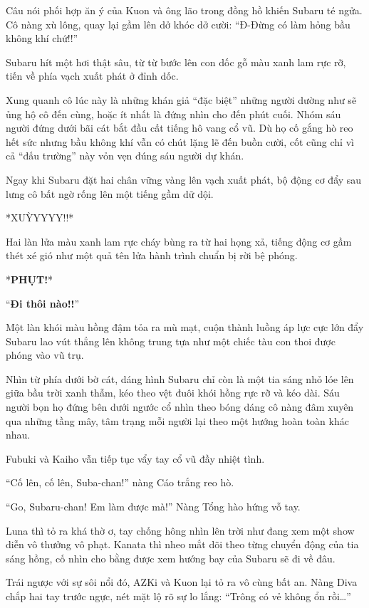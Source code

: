 \documentclass[../main.tex]{subfiles}
\begin{document}
Câu nói phối hợp ăn ý của Kuon và ông lão trong đồng hồ khiến Subaru té ngửa. Cô nàng xù lông, quay lại gầm lên dở khóc dở cười: ``Đ-Đừng có làm hỏng bầu không khí chứ!!''

\ct

Subaru hít một hơi thật sâu, từ từ bước lên con dốc gỗ màu xanh lam rực rỡ, tiến về phía vạch xuất phát ở đỉnh dốc.

Xung quanh cô lúc này là những khán giả ``đặc biệt'' những người dường như sẽ ủng hộ cô đến cùng, hoặc ít nhất là đứng nhìn cho đến phút cuối. Nhóm sáu người đứng dưới bãi cát bắt đầu cất tiếng hô vang cổ vũ. Dù họ cố gắng hò reo hết sức nhưng bầu không khí vẫn có chút lặng lẽ đến buồn cười, cốt cũng chỉ vì cả ``đấu trường'' này vỏn vẹn đúng sáu người dự khán.

Ngay khi Subaru đặt hai chân vững vàng lên vạch xuất phát, bộ động cơ đẩy sau lưng cô bất ngờ rống lên một tiếng gầm dữ dội.

*XUỲYYYY!!*

Hai làn lửa màu xanh lam rực cháy bùng ra từ hai họng xả, tiếng động cơ gầm thét xé gió như một quả tên lửa hành trình chuẩn bị rời bệ phóng.

*\textbf{PHỤT!}*

``\textbf{Đi thôi nào!!}''

Một làn khói màu hồng đậm tỏa ra mù mạt, cuộn thành luồng áp lực cực lớn đẩy Subaru lao vút thẳng lên không trung tựa như một chiếc tàu con thoi được phóng vào vũ trụ.

Nhìn từ phía dưới bờ cát, dáng hình Subaru chỉ còn là một tia sáng nhỏ lóe lên giữa bầu trời xanh thẫm, kéo theo vệt đuôi khói hồng rực rỡ và kéo dài. Sáu người bọn họ đứng bên dưới ngước cổ nhìn theo bóng dáng cô nàng đâm xuyên qua những tầng mây, tâm trạng mỗi người lại theo một hướng hoàn toàn khác nhau.


Fubuki và Kaiho vẫn tiếp tục vẩy tay cổ vũ đầy nhiệt tình.

``Cố lên, cố lên, Suba-chan!'' nàng Cáo trắng reo hò.

``Go, Subaru-chan! Em làm được mà!'' Nàng Tổng hào hứng vỗ tay.

Luna thì tỏ ra khá thờ ơ, tay chống hông nhìn lên trời như đang xem một show diễn vô thưởng vô phạt. Kanata thì nheo mắt dõi theo từng chuyển động của tia sáng hồng, cố nhìn cho bằng được xem hướng bay của Subaru sẽ đi về đâu.

Trái ngược với sự sôi nổi đó, AZKi và Kuon lại tỏ ra vô cùng bất an. Nàng Diva chắp hai tay trước ngực, nét mặt lộ rõ sự lo lắng: ``Trông có vẻ không ổn rồi\dots''
\end{document}
